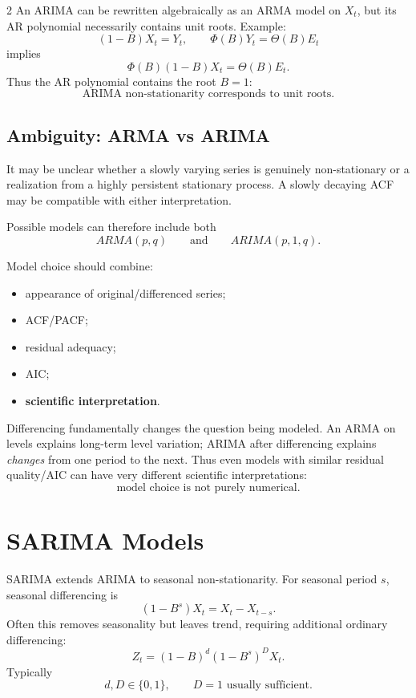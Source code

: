 \documentclass[9pt,a4paper]{extarticle}
\newcommand{\key}[1]{\textbf{#1}}
\begin{document}
\begin{multicols}{2}
An ARIMA can be rewritten algebraically as an ARMA model on \(X_t\), but its AR polynomial necessarily contains unit roots. Example:
\[
(1-B)X_t=Y_t,\qquad \Phi(B)Y_t=\Theta(B)E_t
\]
implies
\[
\Phi(B)(1-B)X_t=\Theta(B)E_t.
\]
Thus the AR polynomial contains the root \(B=1\):
\[
\boxed{\text{ARIMA non-stationarity corresponds to unit roots}.}
\]

\subsection{Ambiguity: ARMA vs ARIMA}

It may be unclear whether a slowly varying series is genuinely non-stationary or a realization from a highly persistent stationary process. A slowly decaying ACF may be compatible with either interpretation.

Possible models can therefore include both
\[
ARMA(p,q)
\qquad\text{and}\qquad
ARIMA(p,1,q).
\]

Model choice should combine:
\begin{itemize}
\item appearance of original/differenced series;
\item ACF/PACF;
\item residual adequacy;
\item AIC;
\item \key{scientific interpretation}.
\end{itemize}

Differencing fundamentally changes the question being modeled. An ARMA on levels explains long-term level variation; ARIMA after differencing explains \emph{changes} from one period to the next. Thus even models with similar residual quality/AIC can have very different scientific interpretations:
\[
\boxed{\text{model choice is not purely numerical}.}
\]

\section{SARIMA Models}

SARIMA extends ARIMA to seasonal non-stationarity. For seasonal period \(s\), seasonal differencing is
\[
(1-B^s)X_t=X_t-X_{t-s}.
\]
Often this removes seasonality but leaves trend, requiring additional ordinary differencing:
\[
\boxed{
Z_t=(1-B)^d(1-B^s)^D X_t.
}
\]
Typically
\[
\boxed{d,D\in\{0,1\},\qquad D=1\text{ usually sufficient}.}
\]


\end{multicols}
\end{document}
